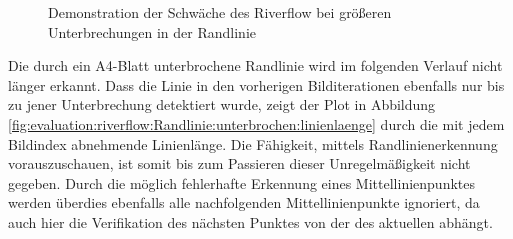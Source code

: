 \begin{figure}[htbp] %
	\hfill
	\caption{Demonstration der Schwäche des Riverflow bei größeren Unterbrechungen in der Randlinie}
	\label{fig:evaluation:riverflow:Randlinie:unterbrochen}
\end{figure}

Die durch ein A4-Blatt unterbrochene Randlinie wird im folgenden Verlauf nicht länger erkannt. Dass die Linie in den vorherigen Bilditerationen ebenfalls nur bis zu jener Unterbrechung detektiert wurde, zeigt der Plot in Abbildung \ref{fig:evaluation:riverflow:Randlinie:unterbrochen:linienlaenge} durch die mit jedem Bildindex abnehmende Linienlänge. Die Fähigkeit, mittels Randlinienerkennung vorauszuschauen, ist somit bis zum Passieren dieser Unregelmäßigkeit nicht gegeben. Durch die möglich fehlerhafte Erkennung eines Mittellinienpunktes werden überdies ebenfalls alle nachfolgenden Mittellinienpunkte ignoriert, da auch hier die Verifikation des nächsten Punktes von der des aktuellen abhängt. 